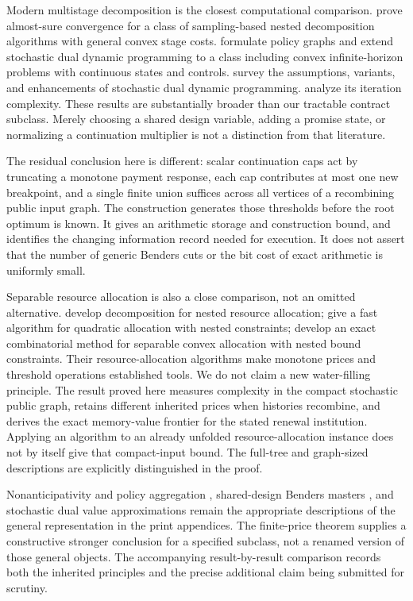 Modern multistage decomposition is the closest computational comparison. \citet{Girardeau2015} prove almost-sure convergence for a class of sampling-based nested decomposition algorithms with general convex stage costs. \citet{Dowson2020} formulate policy graphs and extend stochastic dual dynamic programming to a class including convex infinite-horizon problems with continuous states and controls. \citet{FullnerRebennack2025} survey the assumptions, variants, and enhancements of stochastic dual dynamic programming. \citet{Lan2023} analyze its iteration complexity. These results are substantially broader than our tractable contract subclass. Merely choosing a shared design variable, adding a promise state, or normalizing a continuation multiplier is not a distinction from that literature.

The residual conclusion here is different: scalar continuation caps act by truncating a monotone payment response, each cap contributes at most one new breakpoint, and a single finite union suffices across all vertices of a recombining public input graph. The construction generates those thresholds before the root optimum is known. It gives an arithmetic storage and construction bound, and identifies the changing information record needed for execution. It does not assert that the number of generic Benders cuts or the bit cost of exact arithmetic is uniformly small.

Separable resource allocation is also a close comparison, not an omitted alternative. \citet{Vidal2016} develop decomposition for nested resource allocation; \citet{SchootUiterkamp2021} give a fast algorithm for quadratic allocation with nested constraints; \citet{Wu2021} develop an exact combinatorial method for separable convex allocation with nested bound constraints. Their resource-allocation algorithms make monotone prices and threshold operations established tools. We do not claim a new water-filling principle. The result proved here measures complexity in the compact stochastic public graph, retains different inherited prices when histories recombine, and derives the exact memory-value frontier for the stated renewal institution. Applying an algorithm to an already unfolded resource-allocation instance does not by itself give that compact-input bound. The full-tree and graph-sized descriptions are explicitly distinguished in the proof.

Nonanticipativity and policy aggregation \citep{RockafellarWets1991}, shared-design Benders masters \citep{Benders1962}, and stochastic dual value approximations \citep{PereiraPinto1991} remain the appropriate descriptions of the general representation in the print appendices. The finite-price theorem supplies a constructive stronger conclusion for a specified subclass, not a renamed version of those general objects. The accompanying result-by-result comparison records both the inherited principles and the precise additional claim being submitted for scrutiny.
